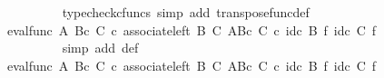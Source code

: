 \begin{isabellebody}
\ \ \ \ \ \ \ \ \ \ \isamarkupfalse%
\ {\isacharparenleft}{\kern0pt}typecheck{\isacharunderscore}{\kern0pt}cfuncs{\isacharcomma}{\kern0pt}\ simp\ add{\isacharcolon}{\kern0pt}\ transpose{\isacharunderscore}{\kern0pt}func{\isacharunderscore}{\kern0pt}def{\isacharparenright}{\kern0pt}\isanewline
\ \ \ \ \ \ \ \ \isamarkupfalse%
\ \isamarkupfalse%
\ {\isachardoublequoteopen}{\isachardot}{\kern0pt}{\isachardot}{\kern0pt}{\isachardot}{\kern0pt}\ {\isacharequal}{\kern0pt}\ {\isacharparenleft}{\kern0pt}{\isacharparenleft}{\kern0pt}eval{\isacharunderscore}{\kern0pt}func\ A\ {\isacharparenleft}{\kern0pt}B{\isasymtimes}\isactrlsub c\ C{\isacharparenright}{\kern0pt}{\isacharparenright}{\kern0pt}\ {\isasymcirc}\isactrlsub c\ {\isacharparenleft}{\kern0pt}associate{\isacharunderscore}{\kern0pt}left\ B\ C\ {\isacharparenleft}{\kern0pt}A\isactrlbsup {\isacharparenleft}{\kern0pt}B{\isasymtimes}\isactrlsub c\ C{\isacharparenright}{\kern0pt}\isactrlesup {\isacharparenright}{\kern0pt}{\isacharparenright}{\kern0pt}{\isacharparenright}{\kern0pt}\ {\isasymcirc}\isactrlsub c\ {\isacharparenleft}{\kern0pt}id\isactrlsub c\ B\ {\isasymtimes}\isactrlsub f\ {\isacharparenleft}{\kern0pt}id\isactrlsub c\ C\ {\isasymtimes}\isactrlsub f\ {\isasympsi}\isactrlsup {\isasymsharp}{\isacharparenright}{\kern0pt}{\isacharparenright}{\kern0pt}{\isachardoublequoteclose}\isanewline
\ \ \ \ \ \ \ \ \ \ \isamarkupfalse%
\ {\isacharparenleft}{\kern0pt}simp\ add{\isacharcolon}{\kern0pt}\ {\isasymphi}{\isacharunderscore}{\kern0pt}def{\isacharparenright}{\kern0pt}\isanewline
\ \ \ \ \ \ \ \ \isamarkupfalse%
\ \isamarkupfalse%
\ {\isachardoublequoteopen}{\isachardot}{\kern0pt}{\isachardot}{\kern0pt}{\isachardot}{\kern0pt}\ {\isacharequal}{\kern0pt}\ {\isacharparenleft}{\kern0pt}eval{\isacharunderscore}{\kern0pt}func\ A\ {\isacharparenleft}{\kern0pt}B{\isasymtimes}\isactrlsub c\ C{\isacharparenright}{\kern0pt}{\isacharparenright}{\kern0pt}\ {\isasymcirc}\isactrlsub c\ {\isacharparenleft}{\kern0pt}associate{\isacharunderscore}{\kern0pt}left\ B\ C\ {\isacharparenleft}{\kern0pt}A\isactrlbsup {\isacharparenleft}{\kern0pt}B{\isasymtimes}\isactrlsub c\ C{\isacharparenright}{\kern0pt}\isactrlesup {\isacharparenright}{\kern0pt}{\isacharparenright}{\kern0pt}\ {\isasymcirc}\isactrlsub c\ {\isacharparenleft}{\kern0pt}id\isactrlsub c\ B\ {\isasymtimes}\isactrlsub f\ {\isacharparenleft}{\kern0pt}id\isactrlsub c\ C\ {\isasymtimes}\isactrlsub f\ {\isasympsi}\isactrlsup {\isasymsharp}{\isacharparenright}{\kern0pt}{\isacharparenright}{\kern0pt}{\isachardoublequoteclose}\isanewline

\end{isabellebody}
